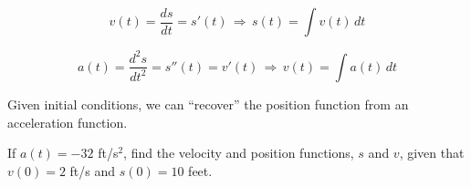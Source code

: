 \documentclass[12pt]{article}
\begin{document}
$$v(t)=\frac{ds}{dt}=s'(t)\,\Longrightarrow\, {s(t)=\int v(t)\,dt}$$

$$a(t)=\frac{d^2s}{dt^2}=s''(t)=v'(t)\,\Longrightarrow\, v(t)=\int a(t)\,dt$$

\vspace{3mm}

Given initial conditions, we can ``recover'' the position function from an acceleration function.

\vspace{5mm}

\Example If $a(t)=-32$ ft/s$^2$, find the velocity and position functions, $s$ and $v$, given that $v(0)=2$ ft/s and $s(0)=10$ feet.
\end{document}

